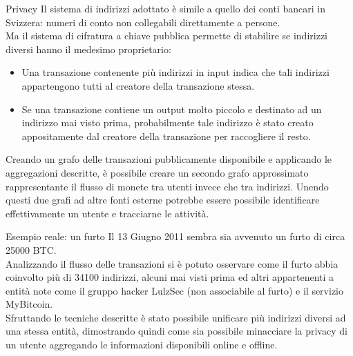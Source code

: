 \documentclass[italian]{beamer}
\begin{document}
\begin{frame}{Privacy} %
\justifying
Il sistema di indirizzi adottato è simile a quello dei conti bancari in Svizzera: numeri di conto non collegabili direttamente a persone.\\
Ma il sistema di cifratura a chiave pubblica permette di stabilire se indirizzi diversi hanno il medesimo proprietario:
\begin{itemize}
\justifying
 \item Una transazione contenente più indirizzi in input indica che tali indirizzi appartengono tutti al creatore della transazione stessa.
 \item Se una transazione contiene un output molto piccolo e destinato ad un indirizzo mai visto prima, probabilmente tale indirizzo è stato creato appositamente dal creatore della transazione per raccogliere il resto.
\end{itemize}
Creando un grafo delle transazioni pubblicamente disponibile e applicando le aggregazioni descritte, è possibile creare un secondo grafo approssimato rappresentante il flusso di monete tra utenti invece che tra indirizzi. Unendo questi due grafi ad altre fonti esterne potrebbe essere possibile identificare effettivamente un utente e tracciarne le attività.
\end{frame}

\begin{frame}{Esempio reale: un furto} %
\justifying
Il 13 Giugno 2011 sembra sia avvenuto un furto di circa 25000 BTC.\\
Analizzando il flusso delle transazioni si è potuto osservare come il furto abbia coinvolto più di 34100 indirizzi, alcuni mai visti prima ed altri appartenenti a entità note come il gruppo hacker LulzSec (non associabile al furto) e il servizio MyBitcoin.\\
Sfruttando le tecniche descritte è stato possibile unificare più indirizzi diversi ad una stessa entità, dimostrando quindi come sia possibile minacciare la privacy di un utente aggregando le informazioni disponibili online e offline.
\end{frame}

\end{document}
